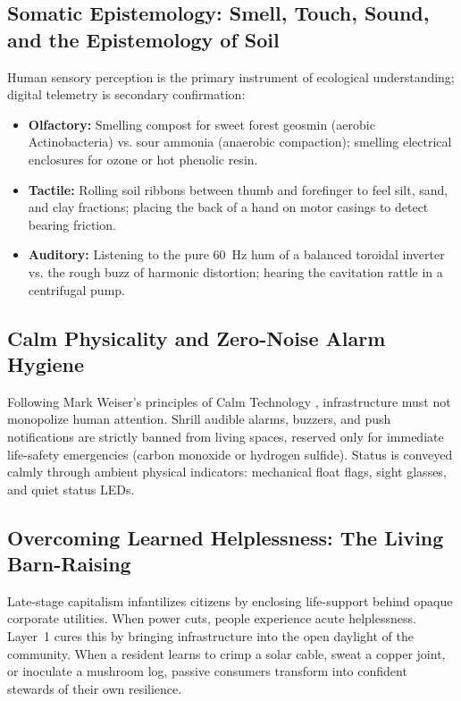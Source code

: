 \subsection{Somatic Epistemology: Smell, Touch, Sound, and the Epistemology of Soil}

Human sensory perception is the primary instrument of ecological understanding; digital telemetry is secondary confirmation:
\begin{itemize}
    \item \textbf{Olfactory:} Smelling compost for sweet forest geosmin (aerobic Actinobacteria) vs. sour ammonia (anaerobic compaction); smelling electrical enclosures for ozone or hot phenolic resin.
    \item \textbf{Tactile:} Rolling soil ribbons between thumb and forefinger to feel silt, sand, and clay fractions; placing the back of a hand on motor casings to detect bearing friction.
    \item \textbf{Auditory:} Listening to the pure 60~Hz hum of a balanced toroidal inverter vs. the rough buzz of harmonic distortion; hearing the cavitation rattle in a centrifugal pump.
\end{itemize}

\subsection{Calm Physicality and Zero-Noise Alarm Hygiene}

Following Mark Weiser's principles of Calm Technology \parencite{weiser1996calm}, infrastructure must not monopolize human attention. Shrill audible alarms, buzzers, and push notifications are strictly banned from living spaces, reserved only for immediate life-safety emergencies (carbon monoxide or hydrogen sulfide). Status is conveyed calmly through ambient physical indicators: mechanical float flags, sight glasses, and quiet status LEDs.

\subsection{Overcoming Learned Helplessness: The Living Barn-Raising}

Late-stage capitalism infantilizes citizens by enclosing life-support behind opaque corporate utilities. When power cuts, people experience acute helplessness. Layer~1 cures this by bringing infrastructure into the open daylight of the community. When a resident learns to crimp a solar cable, sweat a copper joint, or inoculate a mushroom log, passive consumers transform into confident stewards of their own resilience.

